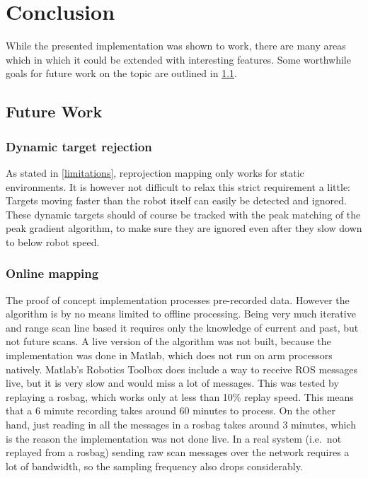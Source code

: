 \chapter{Conclusion}\label{conclusion}

While the presented implementation was shown to work, there are many areas which in which it could be extended with interesting features. Some worthwhile goals for future work on the topic are outlined in \cref{future-work}.

\section{Future Work}\label{future-work}

\subsection{Dynamic target rejection}\label{dynamic-target-rejection}

As stated in \cref{limitations}, reprojection mapping only works for static environments. It is however not difficult to relax this strict requirement a little: Targets moving faster than the robot itself can easily be detected and ignored. These dynamic targets should of course be tracked with the peak matching of the peak gradient algorithm, to make sure they are ignored even after they slow down to below robot speed.

\subsection{Online mapping}\label{online-mapping}

The proof of concept implementation processes pre-recorded data. However
the algorithm is by no means limited to offline processing. Being very
much iterative and range scan line based it requires only the knowledge
of current and past, but not future scans. A live version of the
algorithm was not built, because the implementation was done in Matlab,
which does not run on arm processors natively. Matlab's Robotics Toolbox
does include a way to receive ROS messages live, but it is very slow and
would miss a lot of messages. This was tested by replaying a rosbag,
which works only at less than 10\% replay speed. This means that a 6
minute recording takes around 60 minutes to process. On the other hand,
just reading in all the messages in a rosbag takes around 3 minutes,
which is the reason the implementation was not done live. In a real
system (i.e.~not replayed from a rosbag) sending raw scan messages over
the network requires a lot of bandwidth, so the sampling frequency also
drops considerably.

